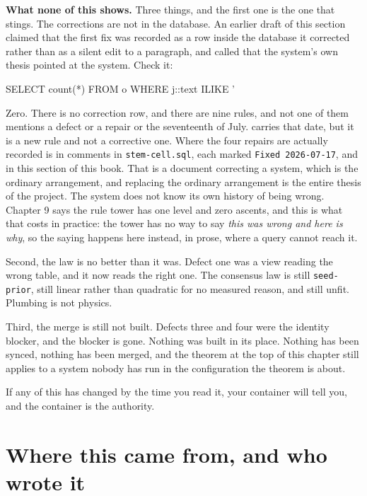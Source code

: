 \textbf{What none of this shows.} Three things, and the first one is the one that stings. The corrections are not in the database. An earlier draft of this section claimed that the first fix was recorded as a row inside the database it corrected rather than as a silent edit to a paragraph, and called that the system's own thesis pointed at the system. Check it:

\begin{Check}
SELECT count(*) FROM o
 WHERE j::text ILIKE '%
\end{Check}

Zero. There is no correction row, and there are nine rules, and not one of them mentions a defect or a repair or the seventeenth of July.  carries that date, but it is a new rule and not a corrective one. Where the four repairs are actually recorded is in comments in \texttt{stem-cell.sql}, each marked \texttt{Fixed 2026-07-17}, and in this section of this book. That is a document correcting a system, which is the ordinary arrangement, and replacing the ordinary arrangement is the entire thesis of the project. The system does not know its own history of being wrong. Chapter 9 says the rule tower has one level and zero ascents, and this is what that costs in practice: the tower has no way to say \textit{this was wrong and here is why}, so the saying happens here instead, in prose, where a query cannot reach it.

Second, the law is no better than it was. Defect one was a view reading the wrong table, and it now reads the right one. The consensus law is still \texttt{seed-prior}, still linear rather than quadratic for no measured reason, and still unfit. Plumbing is not physics.

Third, the merge is still not built. Defects three and four were the identity blocker, and the blocker is gone. Nothing was built in its place. Nothing has been synced, nothing has been merged, and the theorem at the top of this chapter still applies to a system nobody has run in the configuration the theorem is about.

If any of this has changed by the time you read it, your container will tell you, and the container is the authority.

\section{Where this came from, and who wrote it}

